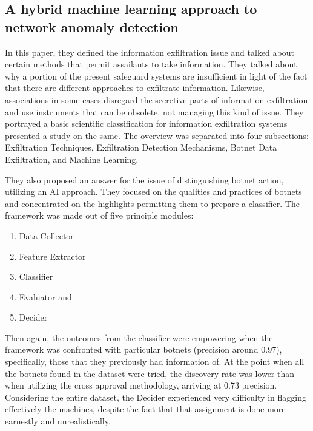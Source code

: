\documentclass[a4paper, 12pt]{article}
\begin{document}
\subsection{A hybrid machine learning approach to network
anomaly detection}
\hspace{1cm} In this paper, they deﬁned the information exﬁltration issue and talked about certain methods that permit assailants to take information. They talked about why a portion of the present safeguard systems are insufficient in light of the fact that there are different approaches to exﬁltrate information. Likewise, associations in some cases disregard the secretive parts of information exﬁltration and use instruments that can be obsolete, not managing this kind of issue. They portrayed a basic scientific classification for information exﬁltration systems presented a study on the same. The overview was separated into four subsections: Exﬁltration Techniques, Exﬁltration Detection Mechanisms, Botnet Data Exﬁltration, and Machine Learning. 
\par
\hspace{0.5cm}
They also  proposed an answer for the issue of distinguishing botnet action, utilizing an AI approach. They focused on the qualities and practices of botnets and concentrated on the highlights permitting them to prepare a classiﬁer. The framework was made out of ﬁve principle modules: 
\begin{enumerate}
    \item Data Collector
    \item Feature Extractor
    \item Classifier
    \item Evaluator and
    \item Decider
\end{enumerate}
\hspace{0.5cm} Then again, the outcomes from the classiﬁer were empowering when the framework was confronted with particular botnets (precision around 0.97), speciﬁcally, those that they previously had information of. At the point when all the botnets found in the dataset were tried, the discovery rate was lower than when utilizing the cross approval methodology, arriving at 0.73 precision. Considering the entire dataset, the Decider experienced very difficulty in ﬂagging effectively the machines, despite the fact that that assignment is done more earnestly and unrealistically.
\end{document}
